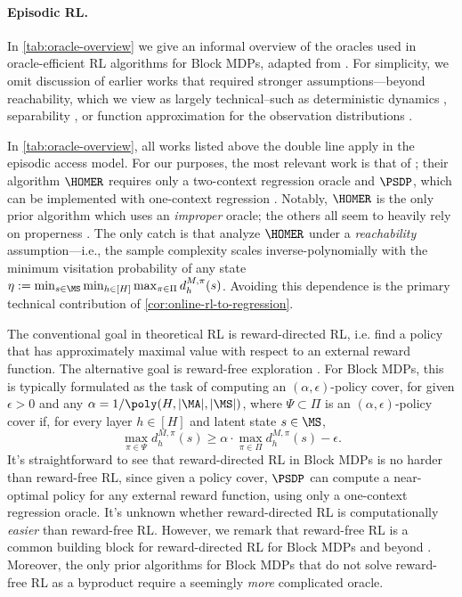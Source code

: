 \paragraph{Episodic RL.} In \cref{tab:oracle-overview} we give an informal overview of the oracles used in oracle-efficient RL algorithms for Block MDPs, adapted from \cite{golowich2024exploration}. For simplicity, we omit discussion of earlier works that required stronger assumptions---beyond reachability, which we view as largely technical--such as deterministic dynamics \citep{dann2018oracle}, separability \citep{du2019provably}, or function approximation for the observation distributions \citep{agarwal2020flambe}.

In \cref{tab:oracle-overview}, all works listed above the double line apply in the episodic access model. For our purposes, the most relevant work is that of \cite{misra2020kinematic}; their algorithm $\HOMER$ requires only a two-context regression oracle and $\PSDP$, which can be implemented with one-context regression \citep{mhammedi2023representation}. Notably, $\HOMER$ is the only prior algorithm which uses an \emph{improper} oracle; the others all seem to heavily rely on properness \citep{modi2021model,zhang2022efficient,mhammedi2023representation}. The only catch is that \cite{misra2020kinematic} analyze $\HOMER$ under a \emph{reachability} assumption---i.e., the sample complexity scales inverse-polynomially with the minimum visitation probability of any state $\eta := \min_{s\in\MS} \min_{h\in[H]} \max_{\pi\in\Pi} d^{M,\pi}_h(s)$. Avoiding this dependence is the primary technical contribution of \cref{cor:online-rl-to-regression}.

The conventional goal in theoretical RL is reward-directed RL, i.e. find a policy that has approximately maximal value with respect to an external reward function. The alternative goal is reward-free exploration \citep{jin2020reward}. For Block MDPs, this is typically formulated as the task of computing an $(\alpha,\epsilon)$-policy cover, for given $\epsilon>0$ and any $\alpha =  1/\poly(H,|\MA|,|\MS|)$, where $\Psi \subset \Pi$ is an $(\alpha,\epsilon)$-policy cover if, for every layer $h \in [H]$ and latent state $s \in \MS$,
\[\max_{\pi\in\Psi} d^{M,\pi}_h(s) \geq \alpha \cdot \max_{\pi\in\Pi} d^{M,\pi}_h(s) - \epsilon.\]
It's straightforward to see that reward-directed RL in Block MDPs is no harder than reward-free RL, since given a policy cover, $\PSDP$ can compute a near-optimal policy for any external reward function, using only a one-context regression oracle. It's unknown whether reward-directed RL is computationally \emph{easier} than reward-free RL. However, we remark that reward-free RL is a common building block for reward-directed RL for Block MDPs \citep{du2019provably,misra2020kinematic,modi2021model,mhammedi2023representation} and beyond \citep{golowich2022learning,golowich2024exploring,mhammedi2023efficient}. Moreover, the only prior algorithms for Block MDPs that do not solve reward-free RL as a byproduct \citep{modi2021model,zhang2022efficient} require a seemingly \emph{more} complicated oracle.

